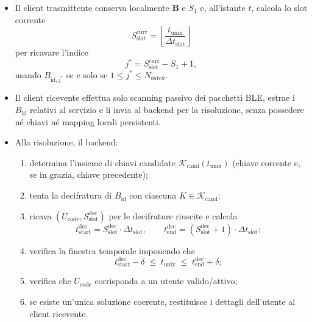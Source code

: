 \documentclass[a4paper,11pt]{article}
\begin{document}
\begin{itemize}
  \item Il client trasmittente conserva localmente \(\mathbf{B}\) e \(S_1\) e, all’istante \(t\),
        calcola lo slot corrente
        \[
          S_{\text{slot}}^{\text{curr}}
          = \left\lfloor \frac{t_{\text{unix}}}{\Delta t_{\text{slot}}} \right\rfloor
        \]
        per ricavare l’indice
        \[
          j^\ast = S_{\text{slot}}^{\text{curr}} - S_1 + 1,
        \]
        usando \(B_{\text{id},j^\ast}\) se e solo se \(1 \le j^\ast \le N_{batch}\).

  \item Il client ricevente effettua solo scanning passivo dei pacchetti BLE, estrae i
        \(B_{\text{id}}\) relativi al servizio e li invia al backend per la risoluzione, senza
        possedere né chiavi né mapping locali persistenti.

  \item Alla risoluzione, il backend:
        \begin{enumerate}[nosep]
          \item determina l’insieme di chiavi candidate
                \(\mathcal{K}_{\mathrm{cand}}(t_{\text{unix}})\) (chiave corrente e, se in grazia,
                chiave precedente);
          \item tenta la decifratura di \(B_{\text{id}}\) con ciascuna \(K \in \mathcal{K}_{\mathrm{cand}}\);
          \item ricava \((U_{\text{code}}, S_{\text{slot}}^{\text{dec}})\) per le decifrature riuscite e
                calcola
                \[
                  t_{\text{start}}^{\text{dec}}
                  = S_{\text{slot}}^{\text{dec}} \cdot \Delta t_{\text{slot}}, \qquad
                  t_{\text{end}}^{\text{dec}}
                  = (S_{\text{slot}}^{\text{dec}} + 1) \cdot \Delta t_{\text{slot}};
                \]
          \item verifica la finestra temporale imponendo che
                \[
                  t_{\text{start}}^{\text{dec}} - \delta
                  \;\le\;
                  t_{\text{unix}}
                  \;\le\;
                  t_{\text{end}}^{\text{dec}} + \delta;
                \]

          \item verifica che \(U_{\text{code}}\) corrisponda a un utente valido/attivo;
          \item se esiste un’unica soluzione coerente, restituisce i dettagli dell’utente al client
                ricevente.
        \end{enumerate}
\end{itemize}
\end{document}

